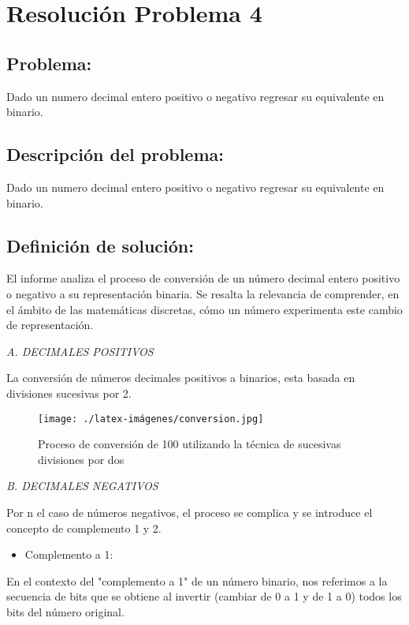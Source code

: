 \section{Resolución Problema 4}
\subsection{Problema:}
Dado un numero decimal entero positivo o negativo regresar su equivalente en binario.


\subsection{\textbf{Descripción del problema:}}
Dado un numero decimal entero positivo o negativo regresar su equivalente en binario.

\subsection{\textbf{Definición de solución:}}
El informe analiza el proceso de conversión de un número decimal entero positivo o negativo a su representación binaria. Se resalta la relevancia de comprender, en el ámbito de las matemáticas discretas, cómo un número experimenta este cambio de representación.
\newline


\item[{\ieeeguilsinglright}] {\it A. DECIMALES POSITIVOS }
   
La conversión de números decimales positivos a binarios, esta basada en divisiones sucesivas por 2. 
\newline

\begin{figure}[h!]
    \centering
    \texttt{[image: ./latex-imágenes/conversion.jpg]}
    \caption{Proceso de conversión de 100 utilizando la técnica de sucesivas divisiones por dos}
    \vspace*{-5pt}
    \label{fig:dos}
\end{figure}


\item[{\ieeeguilsinglright}] {\it B. DECIMALES NEGATIVOS }

Por n el caso de números negativos, el proceso se complica y se introduce el concepto de complemento 1 y 2.

\begin{itemize}
    \item Complemento a 1:
\end{itemize}
En el contexto del "complemento a 1" de un número binario, nos referimos a la secuencia de bits que se obtiene al invertir (cambiar de 0 a 1 y de 1 a 0) todos los bits del número original. 
\newline

